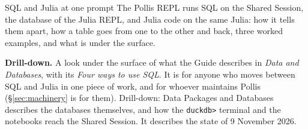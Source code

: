 

\usepackage{titlesec}
\usepackage{tabularx}
\usepackage{booktabs}
\usepackage{listings}

\fancyhf{}
\fancyfoot[R]{\footnotesize\color{soft}\thepage}

\titleformat{\section}{\color{navy}\large\bfseries}{\color{deepamber}\thesection}{0.6em}{}
\titleformat{\subsection}{\color{navy}\normalsize\bfseries}{\color{deepamber}\thesubsection}{0.5em}{}
\titlespacing*{\section}{0pt}{12pt}{4pt}
\titlespacing*{\subsection}{0pt}{8pt}{2pt}
\setlength{\parskip}{4pt}


\usepackage{xurl}
\newcommand{\file}[1]{{\small\nolinkurl{#1}}}



  {SQL and Julia at one prompt}
  {The Pollis REPL runs SQL on the Shared Session, the database of the Julia REPL, and Julia code on the same Julia:
   how it tells them apart, how a table goes from one to the other and back, three worked examples, and what is under
   the surface.}

\begin{nbox}
{\color{amber}\bfseries Drill-down.}\enspace
A look under the surface of what the Guide describes in \emph{Data and Databases}, with its \emph{Four ways to use
SQL}. It is for anyone who moves between SQL and Julia in one piece of work, and for whoever maintains Pollis
(\S\ref{sec:machinery} is for them). Drill-down: Data Packages and Databases describes the databases themselves, and
how the \file{duckdb>} terminal and the notebooks reach the Shared Session. It describes the state of 9 November 2026.
\end{nbox}

